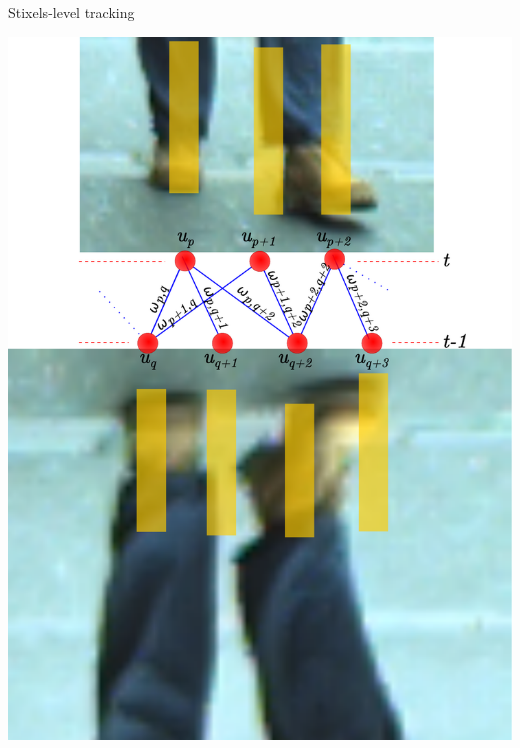 \begin{frame}[plain]{Stixels-level tracking}
\begin{overlayarea}{\textwidth}{\textheight}
{\begin{itemize}
    \end{itemize}
    }
  \end{overlayarea}
  \begin{overlayarea}{\textwidth}{\textheight}
     {
    \vspace{-5.15cm}
    \begin{block}{}
      \begin{center}
	\includegraphics[height=0.7\textheight, trim=80 240 50 50,clip]{bipartite_graph_extended}
      \end{center}
    \end{block}
    }
  \end{overlayarea}
  

\end{frame}

